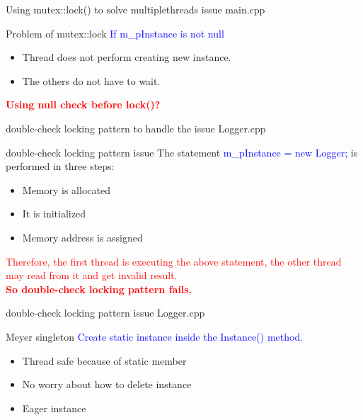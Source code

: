 \documentclass[13pt]{beamer}
\begin{document}
\begin{frame}{Using mutex::lock() to solve multiplethreads issue}
main.cpp
\lstset{basicstyle=\tiny,style=myCustomCppStyle}

\end{frame}

\begin{frame}{Problem of mutex::lock}
	\textcolor{blue}{If m\_pInstance is not null}	
	\begin{itemize}
		\setlength\itemsep{1em}
		\item Thread does not perform creating new instance.
		\item The others do not have to wait. 
	\end{itemize}
	\textcolor{red}{\textbf{Using null check before lock()?}}
\end{frame}

\begin{frame}{double-check locking pattern to handle the issue}
Logger.cpp
\lstset{basicstyle=\tiny,style=myCustomCppStyle}

\end{frame}

\begin{frame}{double-check locking pattern issue}
The statement \textcolor{blue}{m\_pInstance = new Logger{};} is performed in three steps:	
\begin{itemize}
	\setlength\itemsep{1em}
	\item Memory is allocated
	\item It is initialized
	\item Memory address is assigned
\end{itemize}
\textcolor{red}{Therefore, the first thread is executing the above statement, the other thread may read from it and get invalid result.\\
\textbf{So double-check locking pattern fails.}}
\end{frame}

\begin{frame}{double-check locking pattern issue}
Logger.cpp
\lstset{basicstyle=\tiny,style=myCustomCppStyle}

\end{frame}

\begin{frame}{Meyer singleton}
\textcolor{blue}{Create static instance inside the Instance() method.}
\begin{itemize}
	\setlength\itemsep{1em}
	\item Thread safe because of static member
	\item No worry about how to delete instance
	\item Eager instance
\end{itemize}
\end{frame}
\end{document}
